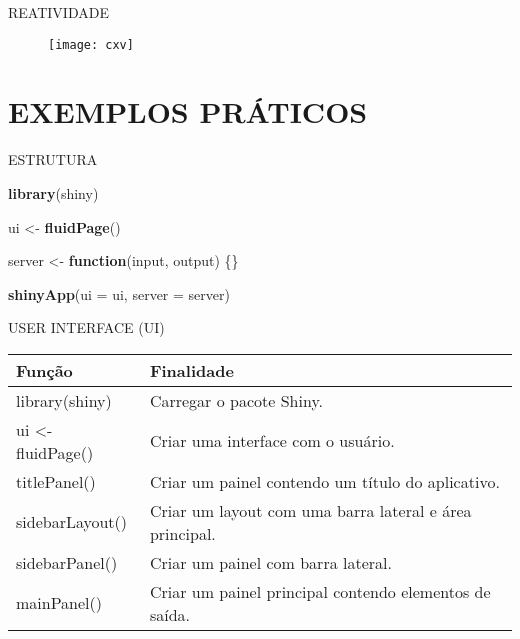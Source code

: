 \documentclass[
  ignorenonframetext,
]{beamer}
\newenvironment{Shaded}{\begin{snugshade}}{\end{snugshade}}
\newcommand{\ControlFlowTok}[1]{\textcolor[rgb]{0.13,0.29,0.53}{\textbf{#1}}}
\newcommand{\DataTypeTok}[1]{\textcolor[rgb]{0.13,0.29,0.53}{#1}}
\newcommand{\KeywordTok}[1]{\textcolor[rgb]{0.13,0.29,0.53}{\textbf{#1}}}
\newcommand{\NormalTok}[1]{#1}
\newcommand{\StringTok}[1]{\textcolor[rgb]{0.31,0.60,0.02}{#1}}
\begin{document}
\begin{frame}{REATIVIDADE}
\protect\hypertarget{reatividade}{}

\begin{figure}
\texttt{[image: cxv]}
\end{figure}

\end{frame}

\hypertarget{exemplos-praticos}{%
\section{EXEMPLOS PRÁTICOS}\label{exemplos-praticos}}

\begin{frame}[fragile]{ESTRUTURA}
\protect\hypertarget{estrutura}{}

\begin{Shaded}
\begin{Highlighting}[]
\KeywordTok{library}\NormalTok{(shiny)}

\NormalTok{ui <-}\StringTok{ }\KeywordTok{fluidPage}\NormalTok{()}

\NormalTok{server <-}\StringTok{ }\ControlFlowTok{function}\NormalTok{(input, output) \{\}}

\KeywordTok{shinyApp}\NormalTok{(}\DataTypeTok{ui =}\NormalTok{ ui, }\DataTypeTok{server =}\NormalTok{ server)}
\end{Highlighting}
\end{Shaded}

\end{frame}

\begin{frame}{USER INTERFACE (UI)}
\protect\hypertarget{user-interface-ui}{}

\begin{table}
\begin{tabular}{l | l}
Função & Finalidade \\
\hline \hline
library(shiny) & \small Carregar o pacote Shiny. \\
ui <- fluidPage() & \small Criar uma interface com o usuário. \\
titlePanel() & \small Criar um painel contendo um título do aplicativo. \\
sidebarLayout() & \small Criar um layout com uma barra lateral e área principal. \\
sidebarPanel() & \small Criar um painel com barra lateral. \\
mainPanel() & \small Criar um painel principal contendo elementos de saída. \\
\end{tabular}
\end{table}

\end{frame}
\end{document}
